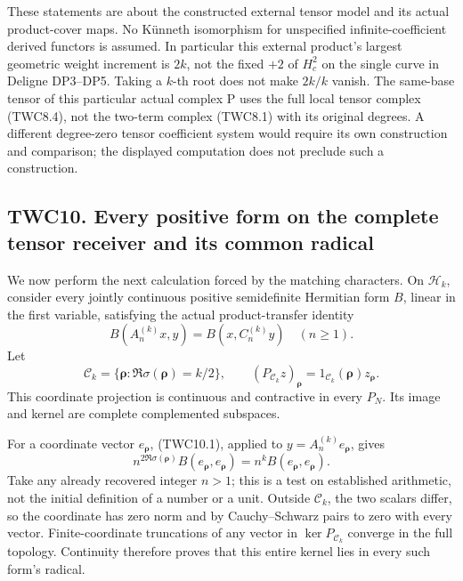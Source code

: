 These statements are about the constructed external tensor model and its
actual product-cover maps. No Künneth isomorphism for unspecified
infinite-coefficient derived functors is assumed. In particular this
external product's largest geometric weight increment is \(2k\), not the
fixed \(+2\) of \(H_c^2\) on the single curve in Deligne DP3--DP5.
Taking a \(k\)-th root does not make \(2k/k\) vanish. The same-base
tensor of this particular actual complex P uses the full local tensor
complex (TWC8.4), not the two-term complex (TWC8.1) with its original
degrees. A different degree-zero tensor coefficient system would require
its own construction and comparison; the displayed computation does not
preclude such a construction.

\subsection{TWC10. Every positive form on the complete tensor receiver
and its common
radical}\label{twc10.-every-positive-form-on-the-complete-tensor-receiver-and-its-common-radical}

We now perform the next calculation forced by the matching characters.
On \(\mathscr H_k\), consider every jointly continuous positive
semidefinite Hermitian form \(B\), linear in the first variable,
satisfying the actual product-transfer identity \[
B(A_n^{(k)}x,y)=B(x,C_n^{(k)}y)\quad(n\ge1).
\tag{TWC10.1}
\] Let \[
\mathscr C_k=\{\boldsymbol\rho:\Re\sigma(\boldsymbol\rho)=k/2\},
\qquad (P_{\mathscr C_k}z)_{\boldsymbol\rho}=1_{\mathscr C_k}(\boldsymbol\rho)z_{\boldsymbol\rho}.
\tag{TWC10.2}
\] This coordinate projection is continuous and contractive in every
\(P_N\). Its image and kernel are complete complemented subspaces.

For a coordinate vector \(e_{\boldsymbol\rho}\), (TWC10.1), applied to
\(y=A_n^{(k)}e_{\boldsymbol\rho}\), gives \[
n^{2\Re\sigma(\boldsymbol\rho)}B(e_{\boldsymbol\rho},e_{\boldsymbol\rho})
=n^kB(e_{\boldsymbol\rho},e_{\boldsymbol\rho}).
\tag{TWC10.3}
\] Take any already recovered integer \(n>1\); this is a test on
established arithmetic, not the initial definition of a number or a
unit. Outside \(\mathscr C_k\), the two scalars differ, so the
coordinate has zero norm and by Cauchy--Schwarz pairs to zero with every
vector. Finite-coordinate truncations of any vector in
\(\ker P_{\mathscr C_k}\) converge in the full topology. Continuity
therefore proves that this entire kernel lies in every such form's
radical.

